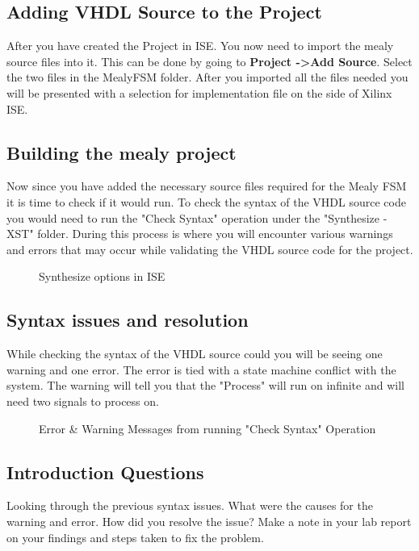 \documentclass{article}
\begin{document}
\subsection{Adding VHDL Source to the Project}
After you have created the Project in ISE. You now need to import the mealy source files into it. This can be done by going to \textbf{Project -\textgreater Add Source}. Select the two files in the MealyFSM folder. After you imported all the files needed you will be presented with a selection for implementation file on the side of Xilinx ISE.

\subsection{Building the mealy project}
Now since you have added the necessary source files required for the Mealy FSM it is time to check if it would run. To check the syntax of the VHDL source code you would need to run the "Check Syntax" operation under the "Synthesize - XST" folder. During this process is where you will encounter various warnings and errors that may occur while validating the VHDL source code for the project.

\begin{figure}[!htb]
  \centering
  \caption{Synthesize options in ISE}
\end{figure}


\subsection{Syntax issues and resolution}
While checking the syntax of the VHDL source could you will be seeing one warning and one error. The error is tied with a state machine conflict with the system. The warning will tell you that the "Process" will run on infinite and will need two signals to process on.

\begin{figure}[!htb]
  \centering
  \caption{Error \& Warning Messages from running "Check Syntax" Operation}
\end{figure}

\subsection{Introduction Questions}
Looking through the previous syntax issues. What were the causes for the warning and error. How did you resolve the issue? Make a note in your lab report on your findings and steps taken to fix the problem.
\end{document}

